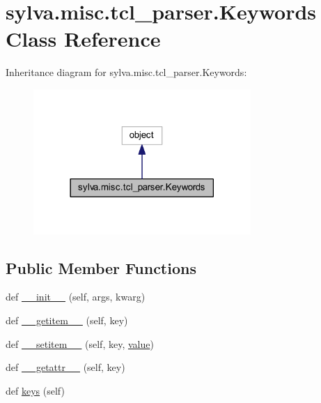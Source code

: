 \hypertarget{classsylva_1_1misc_1_1tcl__parser_1_1_keywords}{}\section{sylva.\+misc.\+tcl\+\_\+parser.\+Keywords Class Reference}
\label{classsylva_1_1misc_1_1tcl__parser_1_1_keywords}


Inheritance diagram for sylva.\+misc.\+tcl\+\_\+parser.\+Keywords\+:\nopagebreak
\begin{figure}[H]
\begin{center}
\leavevmode
\includegraphics[width=234pt]{classsylva_1_1misc_1_1tcl__parser_1_1_keywords__inherit__graph}
\end{center}
\end{figure}
\subsection*{Public Member Functions}
\begin{DoxyCompactItemize}
\item 
def \hyperlink{classsylva_1_1misc_1_1tcl__parser_1_1_keywords_a4b7a15b3c0639416663e46d942c9b9be}{\+\_\+\+\_\+init\+\_\+\+\_\+} (self, args, kwarg)
\item 
def \hyperlink{classsylva_1_1misc_1_1tcl__parser_1_1_keywords_ae638df94fbcd53ba58d430f33daef296}{\+\_\+\+\_\+getitem\+\_\+\+\_\+} (self, key)
\item 
def \hyperlink{classsylva_1_1misc_1_1tcl__parser_1_1_keywords_a3472d59fe7173f29ba51f1153a8d9710}{\+\_\+\+\_\+setitem\+\_\+\+\_\+} (self, key, \hyperlink{namespacesylva_1_1misc_1_1tcl__parser_a83a1a4d978bc1a8a1bd92f71b754bad9}{value})
\item 
def \hyperlink{classsylva_1_1misc_1_1tcl__parser_1_1_keywords_a0a9e148d0396587905bf17d93d3cac1a}{\+\_\+\+\_\+getattr\+\_\+\+\_\+} (self, key)
\item 
def \hyperlink{classsylva_1_1misc_1_1tcl__parser_1_1_keywords_aab14f0aa36691de260b7c63be5ad6ee9}{keys} (self)
\end{DoxyCompactItemize}


